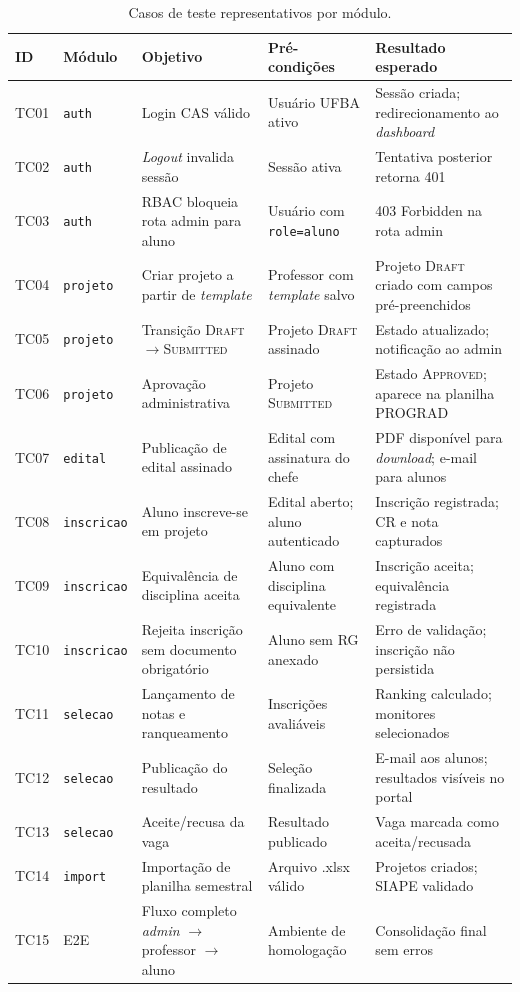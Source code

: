 \documentclass[portuguese]{sbc2025}%
\begin{document}
\begin{table}[H]
  \centering
  \small
  \caption{Casos de teste representativos por módulo.}
  \label{tab:test-cases}
  \begin{tabular}{|l|l|p{4.5cm}|p{4.5cm}|p{3.5cm}|}
    \hline
    \textbf{ID} & \textbf{Módulo} & \textbf{Objetivo} & \textbf{Pré-condições} & \textbf{Resultado esperado} \\
    \hline
    TC01 & \texttt{auth} & Login CAS válido & Usuário UFBA ativo & Sessão criada; redirecionamento ao \textit{dashboard} \\ \hline
    TC02 & \texttt{auth} & \textit{Logout} invalida sessão & Sessão ativa & Tentativa posterior retorna 401 \\ \hline
    TC03 & \texttt{auth} & RBAC bloqueia rota admin para aluno & Usuário com \texttt{role=aluno} & 403 Forbidden na rota admin \\ \hline
    TC04 & \texttt{projeto} & Criar projeto a partir de \textit{template} & Professor com \textit{template} salvo & Projeto \textsc{Draft} criado com campos pré-preenchidos \\ \hline
    TC05 & \texttt{projeto} & Transição \textsc{Draft}$\to$\textsc{Submitted} & Projeto \textsc{Draft} assinado & Estado atualizado; notificação ao admin \\ \hline
    TC06 & \texttt{projeto} & Aprovação administrativa & Projeto \textsc{Submitted} & Estado \textsc{Approved}; aparece na planilha PROGRAD \\ \hline
    TC07 & \texttt{edital} & Publicação de edital assinado & Edital com assinatura do chefe & PDF disponível para \textit{download}; e-mail para alunos \\ \hline
    TC08 & \texttt{inscricao} & Aluno inscreve-se em projeto & Edital aberto; aluno autenticado & Inscrição registrada; CR e nota capturados \\ \hline
    TC09 & \texttt{inscricao} & Equivalência de disciplina aceita & Aluno com disciplina equivalente & Inscrição aceita; equivalência registrada \\ \hline
    TC10 & \texttt{inscricao} & Rejeita inscrição sem documento obrigatório & Aluno sem RG anexado & Erro de validação; inscrição não persistida \\ \hline
    TC11 & \texttt{selecao} & Lançamento de notas e ranqueamento & Inscrições avaliáveis & Ranking calculado; monitores selecionados \\ \hline
    TC12 & \texttt{selecao} & Publicação do resultado & Seleção finalizada & E-mail aos alunos; resultados visíveis no portal \\ \hline
    TC13 & \texttt{selecao} & Aceite/recusa da vaga & Resultado publicado & Vaga marcada como aceita/recusada \\ \hline
    TC14 & \texttt{import} & Importação de planilha semestral & Arquivo .xlsx válido & Projetos criados; SIAPE validado \\ \hline
    TC15 & E2E & Fluxo completo \textit{admin} $\to$ professor $\to$ aluno & Ambiente de homologação & Consolidação final sem erros \\ \hline
  \end{tabular}
\end{table}
\end{document}
